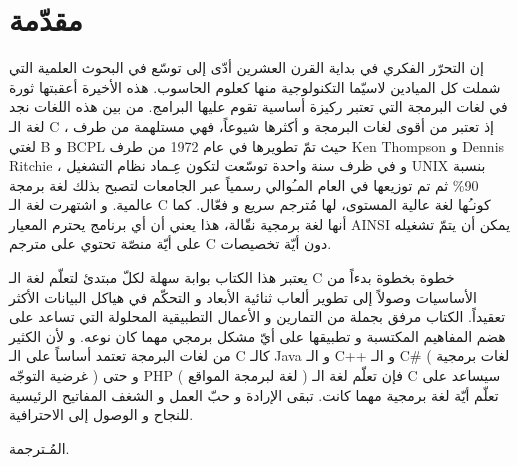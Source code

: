 \chapter*{مقدّمة}
إن التحرّر الفكري في بداية القرن العشرين أدّى إلى توسّع في البحوث العلمية التي شملت كل الميادين لاسيّما التكنولوجية منها كعلوم الحاسوب. هذه الأخيرة أعقبتها ثورة في لغات البرمجة التي تعتبر ركيزة أساسية تقوم عليها البرامج. من بين هذه اللغات نجد لغة الـ
\textenglish{C}
، إذ تعتبر من أقوى لغات البرمجة و أكثرها شيوعاً، فهي مستلهمة من طرف لغتي
 \textenglish{B}
 و
 \textenglish{BCPL}
حيث تمّ تطويرها في عام 1972 من طرف
\textenglish{Ken Thompson}
 و
 \textenglish{Dennis Ritchie}
، و في ظرف سنة واحدة توسّعت لتكون عِـماد نظام التشغيل
\textenglish{UNIX}
 بنسبة
 90\%
ثم تم توزيعها في العام المـُوالي رسمياً عبر الجامعات لتصبح بذلك لغة برمجة عالمية. و اشتهرت لغة الـ
\textenglish{C}
 كونـُها لغة عالية المستوى، لها مُترجم سريع و فعّال. كما أنها لغة برمجية نقّالة، هذا يعني أن أي برنامج يحترم المعيار
AINSI
 يمكن أن يتمّ تشغيله على أيّة منصّة تحتوي على مترجم
\textenglish{C}
 دون أيّة تخصيصات.

يعتبر هذا الكتاب بوابة سهلة لكلّ مبتدئ لتعلّم لغة الـ
\textenglish{C}
 خطوة بخطوة بدءاً من الأساسيات وصولاً إلى تطوير ألعاب ثنائية الأبعاد و التحكّم في هياكل البيانات الأكثر تعقيداً. الكتاب مرفق بجملة من التمارين و الأعمال التطبيقية المحلولة التي تساعد على هضم المفاهيم المكتسبة و تطبيقها على أيّ مشكل برمجي مهما كان نوعه. و لأن الكثير من لغات البرمجة تعتمد أساساً على الـ
\textenglish{C}
كالـ
\textenglish{Java}
و الـ
\textenglish{C++}
 و الـ
\textenglish{C\#}
 ( لغات برمجية غرضية التوجّه ) و حتى
 \textenglish{PHP}
 ( لغة لبرمجة المواقع ) فإن تعلّم لغة الـ
\textenglish{C}
 سيساعد على تعلّم أيّة لغة برمجية مهما كانت. تبقى الإرادة و حبّ العمل و الشغف المفاتيح الرئيسية للنجاح و الوصول إلى الاحترافية.

\hfill المُـترجمة.

